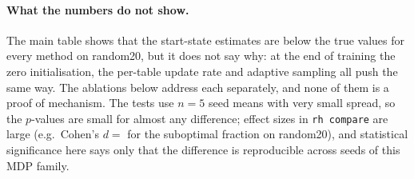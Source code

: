 \paragraph{What the numbers do not show.} The main table shows that the start-state estimates are below the true values for every method on random20, but it does not say why: at the end of training the zero initialisation, the per-table update rate and adaptive sampling all push the same way. The ablations below address each separately, and none of them is a proof of mechanism. The tests use $n=5$ seed means with very small spread, so the $p$-values are small for almost any difference; effect sizes in \texttt{rh compare} are large (e.g.\ Cohen's $d=$ for the suboptimal fraction on random20), and statistical significance here says only that the difference is reproducible across seeds of this MDP family.
